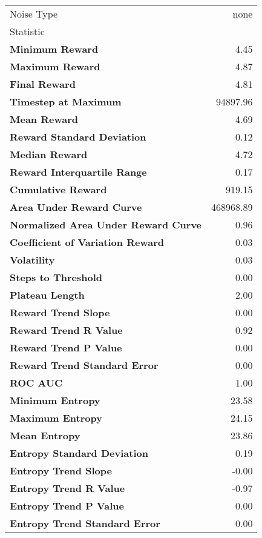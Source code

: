 \begin{tabular}{lr}
\toprule
Noise Type & none \\
Statistic &  \\
\midrule
\textbf{Minimum Reward} & 4.45 \\
\textbf{Maximum Reward} & 4.87 \\
\textbf{Final Reward} & 4.81 \\
\textbf{Timestep at Maximum} & 94897.96 \\
\textbf{Mean Reward} & 4.69 \\
\textbf{Reward Standard Deviation} & 0.12 \\
\textbf{Median Reward} & 4.72 \\
\textbf{Reward Interquartile Range} & 0.17 \\
\textbf{Cumulative Reward} & 919.15 \\
\textbf{Area Under Reward Curve} & 468968.89 \\
\textbf{Normalized Area Under Reward Curve} & 0.96 \\
\textbf{Coefficient of Variation Reward} & 0.03 \\
\textbf{Volatility} & 0.03 \\
\textbf{Steps to Threshold} & 0.00 \\
\textbf{Plateau Length} & 2.00 \\
\textbf{Reward Trend Slope} & 0.00 \\
\textbf{Reward Trend R Value} & 0.92 \\
\textbf{Reward Trend P Value} & 0.00 \\
\textbf{Reward Trend Standard Error} & 0.00 \\
\textbf{ROC AUC} & 1.00 \\
\textbf{Minimum Entropy} & 23.58 \\
\textbf{Maximum Entropy} & 24.15 \\
\textbf{Mean Entropy} & 23.86 \\
\textbf{Entropy Standard Deviation} & 0.19 \\
\textbf{Entropy Trend Slope} & -0.00 \\
\textbf{Entropy Trend R Value} & -0.97 \\
\textbf{Entropy Trend P Value} & 0.00 \\
\textbf{Entropy Trend Standard Error} & 0.00 \\
\bottomrule
\end{tabular}
